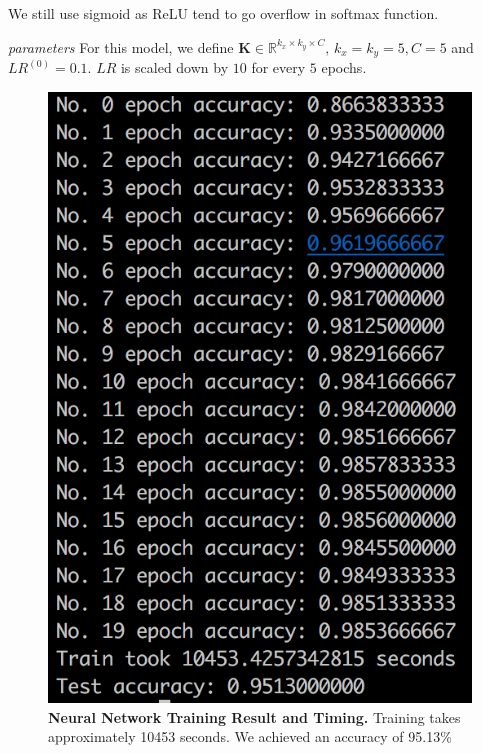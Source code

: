 \documentclass[reqno,12pt]{article}
\begin{document}
We still use sigmoid as ReLU tend to go overflow in softmax function.

\textit{parameters} For this model, we define $\mathbf{K} \in \mathbb{R}^{k_x \times k_y \times C},\, k_x=k_y=5, C = 5$ 
and $LR^{(0)}=0.1$. $LR$ is scaled down by $10$ for every $5$ epochs.

\begin{figure}[!t]
  \centering 
  \includegraphics[width = \textwidth]{HW2_result.png}

  \vskip0.25cm

  \caption{\textnormal{\bf Neural Network Training Result and Timing.} 
  Training takes approximately 10453 seconds. We achieved an accuracy of 95.13\%}
  \label{fig:res}
\end{figure}
\end{document}
